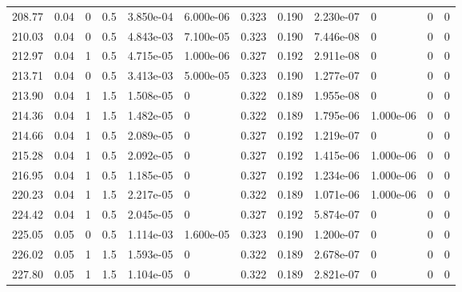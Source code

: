 \documentclass[preview]{standalone}
\begin{document}
{{\begin{tabular}{L{1.2cm}C{1.2cm} C{0.3cm}C{0.5cm} C{1.4cm}C{1.4cm} C{1.4cm}C{1.4cm} C{1.6cm}C{1.6cm} C{1.6cm}C{1.6cm}}
  208.77  &  0.04  & 0     & 0.5 &  3.850e-04  & 6.000e-06  &  0.323&   0.190& 2.230e-07 & 0   &  0 & 0  \\ 
  210.03  &  0.04  & 0     & 0.5 &  4.843e-03  & 7.100e-05  &  0.323&   0.190& 7.446e-08 & 0   &  0 & 0  \\ 
  212.97  &  0.04  & 1     & 0.5 &  4.715e-05  & 1.000e-06  &  0.327&   0.192& 2.911e-08 & 0   &  0 & 0  \\ 
  213.71  &  0.04  & 0     & 0.5 &  3.413e-03  & 5.000e-05  &  0.323&   0.190& 1.277e-07 & 0   &  0 & 0  \\ 
  213.90  &  0.04  & 1     & 1.5 &  1.508e-05  & 0  &  0.322&   0.189& 1.955e-08 & 0   &  0 & 0  \\ 
  214.36  &  0.04  & 1     & 1.5 &  1.482e-05  & 0  &  0.322&   0.189& 1.795e-06 & 1.000e-06   &  0 & 0  \\ 
  214.66  &  0.04  & 1     & 0.5 &  2.089e-05  & 0  &  0.327&   0.192& 1.219e-07 & 0   &  0 & 0  \\ 
  215.28  &  0.04  & 1     & 0.5 &  2.092e-05  & 0  &  0.327&   0.192& 1.415e-06 & 1.000e-06   &  0 & 0  \\ 
  216.95  &  0.04  & 1     & 0.5 &  1.185e-05  & 0  &  0.327&   0.192& 1.234e-06 & 1.000e-06   &  0 & 0  \\ 
  220.23  &  0.04  & 1     & 1.5 &  2.217e-05  & 0  &  0.322&   0.189& 1.071e-06 & 1.000e-06   &  0 & 0  \\ 
  224.42  &  0.04  & 1     & 0.5 &  2.045e-05  & 0  &  0.327&   0.192& 5.874e-07 & 0   &  0 & 0  \\ 
  225.05  &  0.05  & 0     & 0.5 &  1.114e-03  & 1.600e-05  &  0.323&   0.190& 1.200e-07 & 0   &  0 & 0  \\ 
  226.02  &  0.05  & 1     & 1.5 &  1.593e-05  & 0  &  0.322&   0.189& 2.678e-07 & 0   &  0 & 0  \\ 
  227.80  &  0.05  & 1     & 1.5 &  1.104e-05  & 0  &  0.322&   0.189& 2.821e-07 & 0   &  0 & 0  \\ 
\hline 
\end{tabular} 

}}
\end{document}
